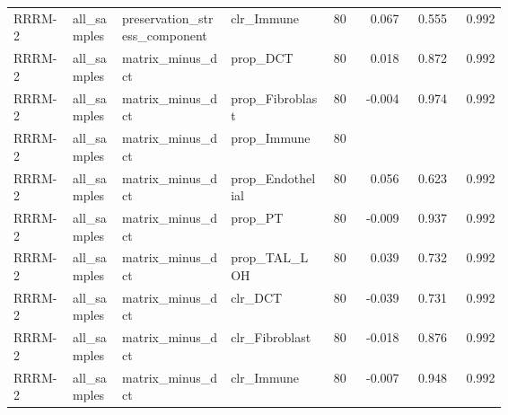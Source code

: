 \documentclass[11pt]{article}
\begin{document}
\begin{landscape}
\begin{longtable}{p{0.12\linewidth}p{0.10\linewidth}p{0.22\linewidth}p{0.20\linewidth}rrrr}
RRRM-2 & all\_samples & preservation\_stress\_component & clr\_Immune & 80 & 0.067 & 0.555 & 0.992 \\
RRRM-2 & all\_samples & matrix\_minus\_dct & prop\_DCT & 80 & 0.018 & 0.872 & 0.992 \\
RRRM-2 & all\_samples & matrix\_minus\_dct & prop\_Fibroblast & 80 & -0.004 & 0.974 & 0.992 \\
RRRM-2 & all\_samples & matrix\_minus\_dct & prop\_Immune & 80 &  &  &  \\
RRRM-2 & all\_samples & matrix\_minus\_dct & prop\_Endothelial & 80 & 0.056 & 0.623 & 0.992 \\
RRRM-2 & all\_samples & matrix\_minus\_dct & prop\_PT & 80 & -0.009 & 0.937 & 0.992 \\
RRRM-2 & all\_samples & matrix\_minus\_dct & prop\_TAL\_LOH & 80 & 0.039 & 0.732 & 0.992 \\
RRRM-2 & all\_samples & matrix\_minus\_dct & clr\_DCT & 80 & -0.039 & 0.731 & 0.992 \\
RRRM-2 & all\_samples & matrix\_minus\_dct & clr\_Fibroblast & 80 & -0.018 & 0.876 & 0.992 \\
RRRM-2 & all\_samples & matrix\_minus\_dct & clr\_Immune & 80 & -0.007 & 0.948 & 0.992 \\
\bottomrule
\end{longtable}
\normalsize
\end{landscape}
\end{document}
